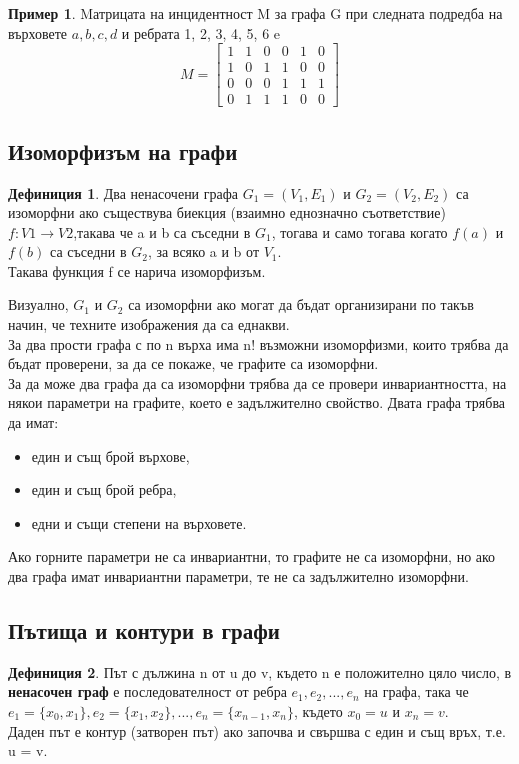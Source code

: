 \documentclass[fleqn, 12pt]{article}
\theoremstyle{definition}
\newtheorem{example}{Пример}[subsection]
\newtheorem{definition}{Дефиниция}[subsection]
\begin{document}
\begin{example}
Mатрицата на инцидентност M за графа G при следната подредба на върховете $a, b, c, d$ и ребрата 1, 2, 3, 4, 5, 6 e \\
$$M = 
\left[
\begin{matrix}
1 & 1 & 0 & 0 & 1 & 0\\
1 & 0 & 1 & 1 & 0 & 0\\
0 & 0 & 0 & 1 & 1 & 1\\
0 & 1 & 1 & 1 &0 & 0
\end{matrix}
\right]$$
\end{example}

\subsection{Изоморфизъм на графи}
\begin{definition}
Два ненасочени графа $G_1= (V_1, E_1)$ и $G_2= (V_2, E_2)$ са изоморфни ако съществува биекция (взаимно еднозначно съответствие) $f:V1 \to V2$,такава че a и b са съседни в $G_1$, тогава и само тогава когато $f(a)$ и $f(b)$ са съседни в $G_2$, за всяко a и b от $V_1$. \\
Такава функция f се нарича изоморфизъм.
\end{definition}
Визуално, $G_1$ и $G_2$ са изоморфни ако могат да бъдат организирани по такъв начин, че техните изображения да са еднакви. \\
За два прости графа с по n върха има n! възможни изоморфизми, които трябва да бъдат проверени, за да се покаже, че графите са изоморфни.\\
За да може два графа да са изоморфни трябва да се провери инвариантността, на някои параметри на графите, което е задължително свойство. Двата графа трябва да имат:
\begin{itemize}
\item един и същ брой върхове,
\item един и същ брой ребра, 
\item едни и същи степени на върховете.
\end{itemize}
Ако  горните параметри не са инвариантни, то графите не са изоморфни, но ако два графа имат инвариантни параметри, те не са задължително изоморфни.

\subsection{Пътища и контури в графи}
\begin{definition}
Път с дължина n от u до v, където n е положително цяло число, в \textbf{ненасочен граф} е последователност от ребра $e_1, e_2, ..., e_n$ на графа, така че $e_1= \{x_0, x_1\}, e_2= \{x_1, x_2\}, ..., e_n= \{x_{n-1}, x_n\}$, където $x_0= u$ и $x_n= v$.\\
Даден път е контур (затворен път) ако започва и свършва с един и същ връх, т.е. u = v. 
\end{definition}
\end{document}

